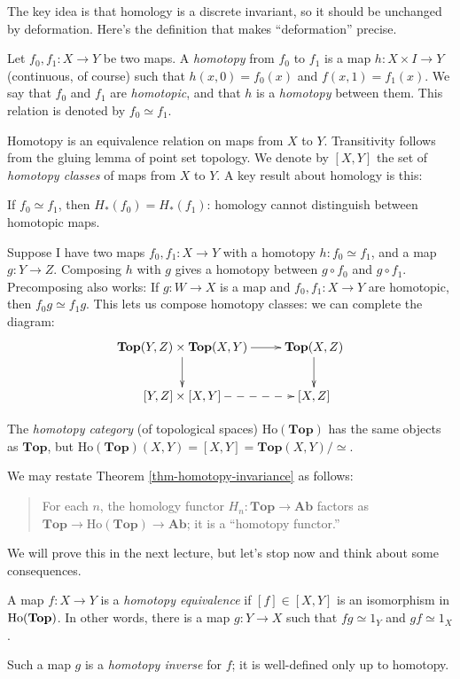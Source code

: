 The key idea is that homology is a discrete invariant, so it should be 
unchanged by deformation. Here's the definition that makes ``deformation''
precise.
\begin{definition}
Let $f_0,f_1:X\to Y$ be two maps. A {\em homotopy} from $f_0$ to $f_1$ is a map $h:X\times I\to Y$ (continuous, of course) such that $h(x,0)=f_0(x)$ and $f(x,1)=f_1(x)$. We say that $f_0$ and $f_1$ are {\em homotopic}, and that $h$ is a {\em homotopy} between them. This relation is denoted by $f_0\simeq f_1$. 
\end{definition}
Homotopy is an equivalence relation on maps from $X$ to $Y$.
Transitivity follows from the gluing lemma of point set topology.
We denote by $[X,Y]$ the set of {\em homotopy classes} of maps from $X$ to $Y$.
A key result about homology is this:
\begin{theorem}\label{thm-homotopy-invariance}
If $f_0\simeq f_1$, then $ H_\ast(f_0)= H_\ast(f_1)$: homology cannot distinguish between homotopic maps.
\end{theorem}
Suppose I have two maps $f_0,f_1:X\to Y$ with a homotopy $h:f_0\simeq f_1$, and a map $g:Y\to Z$. Composing $h$ with $g$ gives a homotopy between $g\circ f_0$ and $g\circ f_1$. Precomposing also works: If $g:W\to X$ is a map and $f_0,f_1:X\to Y$ are homotopic, then $f_0g\simeq f_1g$. This lets us compose homotopy classes: we can complete the diagram:
\begin{equation*}
\xymatrix{\mathbf{Top}(Y,Z)\times\mathbf{Top}(X,Y)\ar[d]\ar[r] & \mathbf{Top}(X,Z)\ar[d]\\
[Y,Z]\times[X,Y]\ar@{-->}[r] & [X,Z]}
\end{equation*}
\begin{definition}
The {\em homotopy category} (of topological spaces) 
$\mathrm{Ho}(\mathbf{Top})$ has the same objects as $\mathbf{Top}$, but
$\mathrm{Ho}(\mathbf{Top})(X,Y)=[X,Y]=\mathbf{Top}(X,Y)/\simeq$.
\end{definition}
We may restate Theorem \ref{thm-homotopy-invariance} as follows:
\begin{quote}
For each $n$,
the homology functor $ H_n:\mathbf{Top}\to\mathbf{Ab}$ factors as $\mathbf{Top}\to\mathrm{Ho}(\mathbf{Top})\to\mathbf{Ab}$; it is a ``homotopy functor.''
\end{quote}
We will prove this in the next lecture, but let's stop now and think about some
consequences. 
\begin{definition}
A map $f:X\to Y$ is a {\em homotopy equivalence} if $[f]\in[X,Y]$ is an isomorphism in $\mathrm{Ho}(\mathbf{Top})$. In other words, there is a map $g:Y\to X$ such that $fg\simeq 1_Y$ and $gf\simeq1_X$. 
\end{definition}
Such a map $g$ is a {\em homotopy inverse} for $f$; it is well-defined
only up to homotopy.

